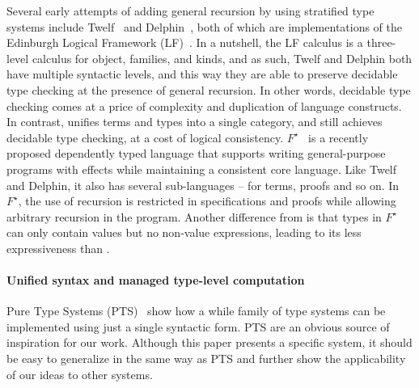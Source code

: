 Several early attempts of adding general recursion by using stratified
type systems include Twelf~\cite{lf:twelf} and
Delphin~\cite{lf:delphin}, both of which are implementations of the
Edinburgh Logical Framework (LF)~\cite{harper:lf}. In a nutshell, the
LF calculus is a three-level calculus for object, families, and kinds,
and as such, Twelf and Delphin both have multiple syntactic levels,
and this way they are able to preserve decidable type checking at the
presence of general recursion. In other words, decidable type checking
comes at a price of complexity and duplication of language
constructs. In contrast, \name unifies terms and types into a single
category, and still achieves decidable type checking, at a cost of
logical consistency. $F^{\star}$~\cite{Swamy2011} is a recently
proposed dependently typed language that supports writing
general-purpose programs with effects while maintaining a consistent
core language. Like Twelf and Delphin, it also has several
sub-languages -- for terms, proofs and so on. In $F^{\star}$, the use
of recursion is restricted in specifications and proofs while allowing
arbitrary recursion in the program. Another difference from \name is
that types in $F^{\star}$ can only contain values but no non-value
expressions, leading to its less expressiveness than \name.

\paragraph{Unified syntax and managed type-level computation}

Pure Type Systems (PTS)~\cite{pts} show how a while family of type
systems can be implemented using just a single syntactic form. PTS are
an obvious source of inspiration for our work. Although this paper
presents a specific system, it should be easy to generalize \name in
the same way as PTS and further show the applicability of our ideas to
other systems.

